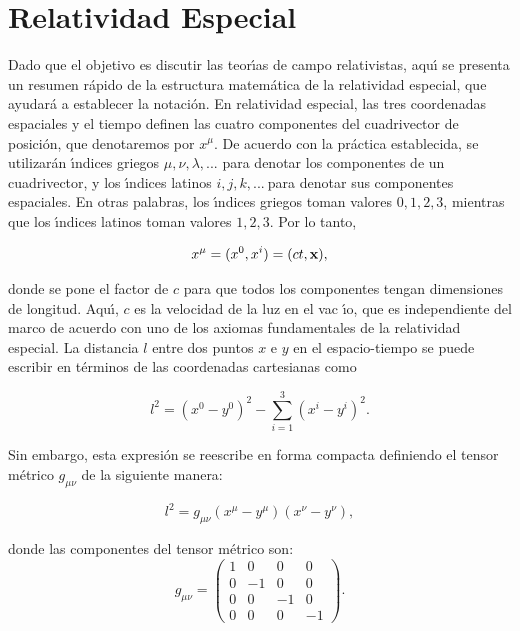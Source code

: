 \section{Relatividad Especial}
Dado que el objetivo es discutir las teor\'{\i}as de campo relativistas, aqu\'{\i} se presenta un resumen r\'{a}pido de la estructura matem\'{a}tica de la
relatividad especial, que ayudar\'{a} a establecer la notaci\'{o}n. En relatividad especial, las tres coordenadas espaciales y el tiempo definen
las cuatro componentes del cuadrivector de posici\'{o}n, que denotaremos por $x^{\mu }$. De acuerdo con la pr\'{a}ctica establecida, se utilizar\'{a}n 
\'{\i}ndices griegos $\mu ,\nu ,\lambda ,...$ para denotar los componentes de un cuadrivector, y los \'{\i}ndices latinos $i,j,k,...~$para denotar sus
componentes espaciales. En otras palabras, los \'{\i}ndices griegos toman valores $0,1,2,3$, mientras que los \'{\i}ndices latinos toman valores $1,2,3$. Por lo tanto,

\begin{equation}
x^{\mu }=(x^{0},x^{i})=(ct,\vb{x})  \label{18},
\end{equation}

donde se pone el factor de $c$ para que todos los componentes tengan dimensiones de longitud. Aqu\'{\i}, $c$ es la velocidad de la luz en el vac%
\'{\i}o, que es independiente del marco de acuerdo con uno de los axiomas fundamentales de la relatividad especial. La distancia $l$ entre dos puntos $%
x$ e $y$ en el espacio-tiempo se puede escribir en t\'{e}rminos de las coordenadas cartesianas como

\begin{equation}
l^{2}=(x^{0}-y^{0})^{2}-\sum\limits_{i=1}^{3}(x^{i}-y^{i})^{2}  \label{19}.
\end{equation}

Sin embargo, esta expresión se reescribe en forma compacta definiendo el tensor m\'{e}trico $g_{\mu \nu }$ de la siguiente manera:

\begin{equation}
l^{2}=g_{\mu \nu }(x^{\mu }-y^{\mu })(x^{\nu }-y^{\nu })  \label{20},
\end{equation}

donde las componentes del tensor m\'{e}trico son: 
\begin{equation}
g_{\mu \nu }=\left( 
\begin{array}{cccc}
1 & 0 & 0 & 0 \\ 
0 & -1 & 0 & 0 \\ 
0 & 0 & -1 & 0 \\ 
0 & 0 & 0 & -1%
\end{array}
\right)   \label{21}.
\end{equation}

